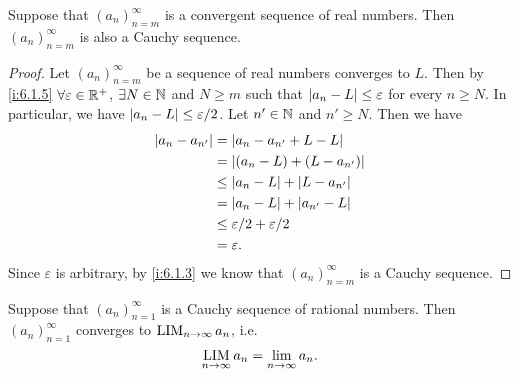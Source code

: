 \begin{prop}\label{i:6.1.12}
  Suppose that \((a_n)_{n = m}^\infty\) is a convergent sequence of real numbers.
  Then \((a_n)_{n = m}^\infty\) is also a Cauchy sequence.
\end{prop}

\begin{proof}
  Let \((a_n)_{n = m}^\infty\) be a sequence of real numbers converges to \(L\).
  Then by \cref{i:6.1.5} \(\forall \varepsilon \in \mathbb{R}^+\), \(\exists N \in \mathbb{N}\) and \(N \geq m\) such that \(\left\lvert a_n - L\right\rvert \leq \varepsilon\) for every \(n \geq N\).
  In particular, we have \(\left\lvert a_n - L\right\rvert \leq \varepsilon / 2\).
  Let \(n' \in \mathbb{N}\) and \(n' \geq N\).
  Then we have
  \begin{align*}
    \left\lvert a_n - a_{n'}\right\rvert & = \left\lvert a_n - a_{n'} + L - L\right\rvert           \\
                       & = \left\lvert(a_n - L) + (L - a_{n'})\right\rvert       \\
                       & \leq \left\lvert a_n - L\right\rvert + \left\lvert L - a_{n'}\right\rvert  \\
                       & = \left\lvert a_n - L\right\rvert + \left\lvert a_{n'} - L\right\rvert     \\
                       & \leq \varepsilon / 2 + \varepsilon / 2 \\
                       & = \varepsilon.
  \end{align*}
  Since \(\varepsilon\) is arbitrary, by \cref{i:6.1.3} we know that \((a_n)_{n = m}^\infty\) is a Cauchy sequence.
\end{proof}

\setcounter{thm}{14}
\begin{prop}\label{i:6.1.15}
  Suppose that \((a_n)_{n = 1}^\infty\) is a Cauchy sequence of rational numbers.
  Then \((a_n)_{n = 1}^\infty\) converges to \(\operatorname*{LIM}_{n \to \infty} a_n\), i.e.
  \[
    \operatorname*{LIM}_{n \to \infty} a_n = \lim_{n \to \infty} a_n.
  \]
\end{prop}

